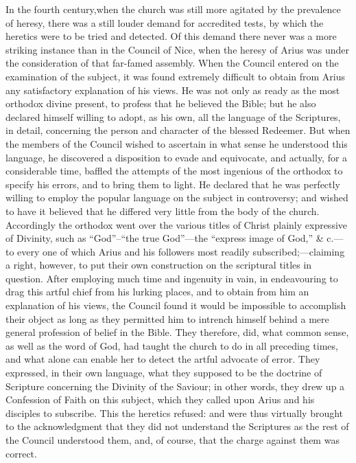 \documentclass[
]{book}
\begin{document}
In the fourth century,when the church was still more agitated by the prevalence of heresy, there was a still louder demand for accredited tests, by which the heretics were to be tried and detected. Of this demand there never was a more striking instance than in the Council of Nice, when the heresy of Arius was under the consideration of that far-famed assembly. When the Council entered on the examination of the subject, it was found extremely difficult to obtain from Arius any satisfactory explanation of his views. He was not only as ready as the most orthodox divine present, to profess that he believed the Bible; but he also declared himself willing to adopt, as his own, all the language of the Scriptures, in detail, concerning the person and character of the blessed Redeemer. But when the members of the Council wished to ascertain in what sense he understood this language, he discovered a disposition to evade and equivocate, and actually, for a considerable time, baffled the attempts of the most ingenious of the orthodox to specify his errors, and to bring them to light. He declared that he was perfectly willing to employ the popular language on the subject in controversy; and wished to have it believed that he differed very little from the body of the church. Accordingly the orthodox went over the various titles of Christ plainly expressive of Divinity, such as ``God''--``the true God''---the ``express image of God,'' \& c.---to every one of which Arius and his followers most readily subscribed;---claiming a right, however, to put their own construction on the scriptural titles in question. After employing much time and ingenuity in vain, in endeavouring to drag this artful chief from his lurking places, and to obtain from him an explanation of his views, the Council found it would be impossible to accomplish their object as long as they permitted him to intrench himself behind a mere general profession of belief in the Bible. They therefore, did, what common sense, as well as the word of God, had taught the church to do in all preceding times, and what alone can enable her to detect the artful advocate of error. They expressed, in their own language, what they supposed to be the doctrine of Scripture concerning the Divinity of the Saviour; in other words, they drew up a Confession of Faith on this subject, which they called upon Arius and his disciples to subscribe. This the heretics refused: and were thus virtually brought to the acknowledgment that they did not understand the Scriptures as the rest of the Council understood them, and, of course, that the charge against them was correct.
\end{document}

